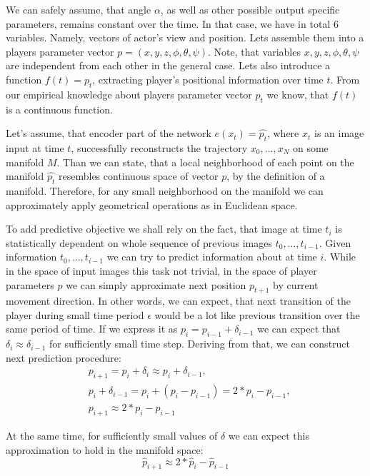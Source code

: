 We can safely assume, that angle $\alpha$, as well as other possible output specific parameters, remains constant over the time.
In that case, we have in total 6 variables.
Namely, vectors of actor's view and position.
Lets assemble them into a players parameter vector $p=(x, y, z, \phi, \theta, \psi)$.
Note, that variables $x, y, z, \phi, \theta, \psi$ are independent from each other in the general case.
Lets also introduce a function $f(t)=p_t$, extracting player's positional information over time $t$.
From our empirical knowledge about players parameter vector $p_t$ we know, that $f(t)$ is a continuous function.

Let's assume, that encoder part of the network $e(x_t)= \hat{p_t}$, where $x_t$ is an image input at time $t$, successfully reconstructs the trajectory ${x_0, \ldots, x_N}$ on some manifold $M$.
Than we can state, that a local neighborhood of each point on the manifold $\hat{p_t}$ resembles continuous space of vector $p$, by the definition of a manifold.
Therefore, for any small neighborhood on the manifold we can approximately apply geometrical operations as in Euclidean space.

To add predictive objective we shall rely on the fact, that image at time $t_i$ is statistically dependent on whole sequence of previous images ${t_0, \ldots, t_{i-1}}$.
Given information ${t_0, \ldots, t_{i-1}}$ we can try to predict information about at time $i$.
While in the space of input images this task not trivial, in the space of player parameters $p$ we can simply approximate next position $p_{t+1}$ by current movement direction.
In other words, we can expect, that next transition of the player during small time period $\epsilon$ would be a lot like previous transition over the same period of time.
If we express it as $p_i = p_{i-1} + \delta_{i-1}$ we can expect that $\delta_i \approx \delta_{i-1}$ for sufficiently small time step. Deriving from that, we can construct next prediction procedure:
\begin{equation}
  \begin{aligned}
    &p_{i+1} = p_i + \delta_i \approx p_i + \delta_{i-1},\\
    &p_i + \delta_{i-1} = p_i + (p_i - p_{i-1}) = 2*p_i - p_{i-1}, \\
    &p_{i+1} \approx 2*p_i - p_{i-1}
  \end{aligned}
\end{equation}

At the same time, for sufficiently small values of $\delta$ we can expect this approximation to hold in the manifold space:
\begin{equation}
  \hat{p}_{i+1} \approx 2*\hat{p}_i - \hat{p}_{i-1}
\end{equation}

